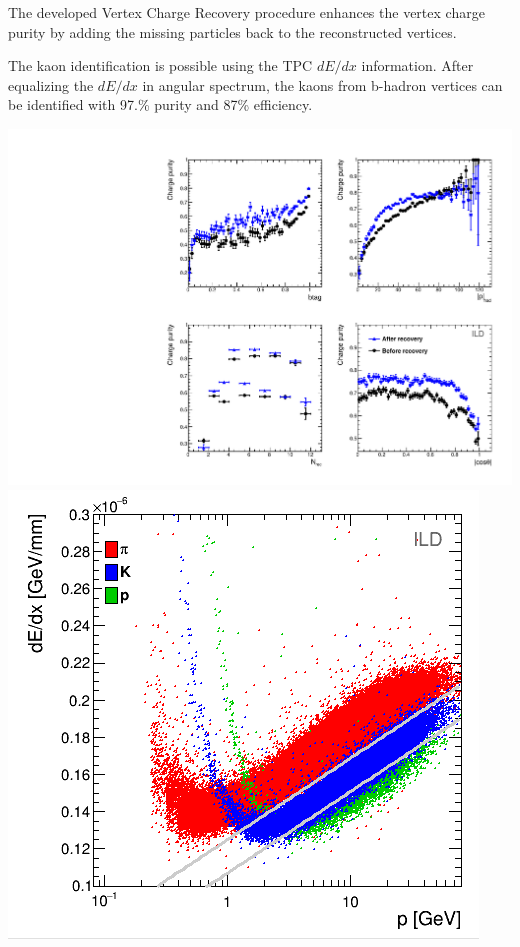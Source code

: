 \color{DarkSlateGray}
The developed Vertex Charge Recovery procedure enhances the vertex charge purity by adding the missing particles back to the reconstructed vertices. 


The kaon identification is possible using the TPC $dE/dx$ information. After equalizing the $dE/dx$ in angular spectrum, the kaons from b-hadron vertices can be identified with 97.\% purity and 87\% efficiency.
\begin{center}\vspace{1cm}
	
	\includegraphics[clip, trim=10cm 0cm 0cm 10cm,width=0.4\linewidth]{plots/purity-recovery-ild.pdf}\label{fig:Charges_a_3}
	\includegraphics[width=0.37\linewidth]{plots/dedx.png}\label{fig:Charges_b_3}
	\label{fig:Charges_3}
\end{center}\vspace{1cm}



